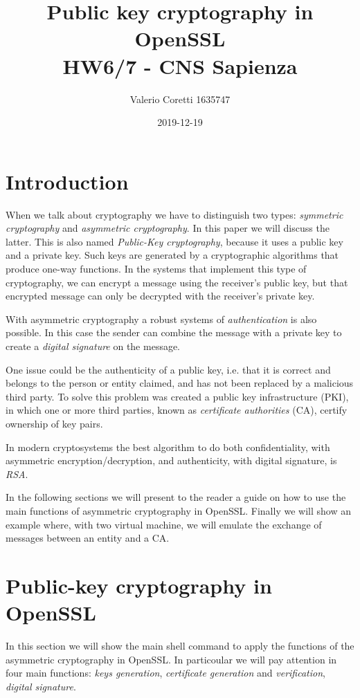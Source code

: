 \documentclass[11pt]{article}
\title{{\bf Public key cryptography in OpenSSL} \\ \bigskip \large HW6/7 - CNS Sapienza}
\date{2019-12-19}
\author{Valerio Coretti 1635747}
\begin{document}
\maketitle

\section{Introduction}
When we talk about cryptography we have to distinguish two types: {\em symmetric cryptography} and {\em asymmetric cryptography}. In this paper we will discuss the latter. This is also named {\em Public-Key cryptography}, because it uses a public key and a private key. Such keys are generated by a cryptographic algorithms that produce one-way functions. In the systems that implement this type of cryptography, we can encrypt a message using the receiver's public key, but that encrypted message can only be decrypted with the receiver's private key.

With asymmetric cryptography a robust systems of {\em authentication} is also possible. In this case the sender can combine the message with a private key to create a {\em digital signature} on the message.

One issue could be the authenticity of a public key, i.e. that it is correct and belongs to the person or entity claimed, and has not been replaced by a malicious third party.
To solve this problem was created a public key infrastructure (PKI), in which one or more third parties, known as {\em certificate authorities} (CA),  certify ownership of key pairs.

In modern cryptosystems the best algorithm to do both confidentiality, with asymmetric encryption/decryption, and authenticity, with digital signature, is {\em RSA}.

In the following sections we will present to the reader a guide on how to use the main functions of asymmetric cryptography in OpenSSL. Finally we will show an example where, with two virtual machine, we will emulate the exchange of messages between an entity and a CA.

\section{Public-key cryptography in OpenSSL}
In this section we will show the main shell command to apply the functions of the asymmetric cryptography in OpenSSL. In particoular we will pay attention in four main functions:
{\em keys generation}, {\em certificate generation} and {\em verification}, {\em digital signature}.
\end{document}
